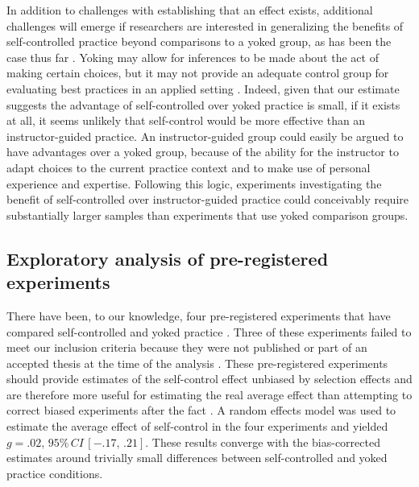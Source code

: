 \documentclass[man,floatsintext,hidelinks]{apa7}
\begin{document}
In addition to challenges with establishing that an effect exists, additional challenges will emerge if researchers are interested in generalizing the benefits of self-controlled practice beyond comparisons to a yoked group, as has been the case thus far \parencite{Ste-Marie2019-bw,Wulf2016-gf}. Yoking may allow for inferences to be made about the act of making certain choices, but it may not provide an adequate control group for evaluating best practices in an applied setting \parencite[e.g.,][]{Barros2019-my,Ste-Marie2019-bw,Yantha2019-dt}. Indeed, given that our estimate suggests the advantage of self-controlled over yoked practice is small, if it exists at all, it seems unlikely that self-control would be more effective than an instructor-guided practice. An instructor-guided group could easily be argued to have advantages over a yoked group, because of the ability for the instructor to adapt choices to the current practice context and to make use of personal experience and expertise. Following this logic, experiments investigating the benefit of self-controlled over instructor-guided practice could conceivably require substantially larger samples than experiments that use yoked comparison groups.

\subsection{Exploratory analysis of pre-registered experiments}
There have been, to our knowledge, four pre-registered experiments that have compared self-controlled and yoked practice \parencite{Grand2017-de,McKay2020-vj,StGermain2020-naspspa,Yantha2019-dt}. Three of these experiments failed to meet our inclusion criteria because they were not published or part of an accepted thesis at the time of the analysis \parencite{McKay2020-vj,StGermain2020-naspspa,Yantha2019-dt}. These pre-registered experiments should provide estimates of the self-control effect unbiased by selection effects and are therefore more useful for estimating the real average effect than attempting to correct biased experiments after the fact \parencite{Carter2019-vv}. A random effects model was used to estimate the average effect of self-control in the four experiments and yielded $g = .02, \,95\%\,CI \,[-.17, \,.21]$. These results converge with the bias-corrected estimates around trivially small differences between self-controlled and yoked practice conditions.
\end{document}
